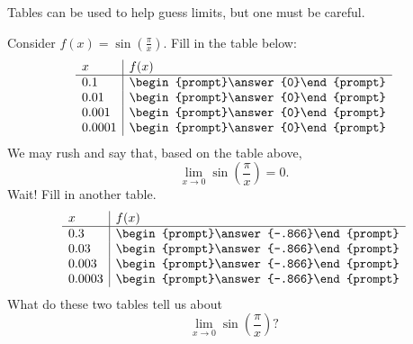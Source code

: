 \documentclass{ximera}
\begin{document}
Tables can be used to help guess limits, but one must be careful.

\begin{question}
  Consider $f(x) = \sin\left(\frac{\pi}{x}\right)$. Fill in the 
  table below:
   \[
  \begin{array}{l|l}
    x      & f(x)      \\ \hline
    0.1    & \begin{prompt}\answer{0}\end{prompt}\\
    0.01   & \begin{prompt}\answer{0}\end{prompt}\\
    0.001  & \begin{prompt}\answer{0}\end{prompt}\\
    0.0001 & \begin{prompt}\answer{0}\end{prompt} 
  \end{array}
    \]
  We may rush and say that, based on the table above,
   \[
  \lim_{x\to 0}\sin\left(\frac{\pi}{x}\right)=0.
  \]
Wait! Fill in another table.
  \[
  \begin{array}{l|l}
    x      & f(x)            \\ \hline
    0.3    &  \begin{prompt}\answer{-.866}\end{prompt} \\
    0.03   &  \begin{prompt}\answer{-.866}\end{prompt} \\
    0.003  &  \begin{prompt}\answer{-.866}\end{prompt} \\
    0.0003 &  \begin{prompt}\answer{-.866}\end{prompt}
  \end{array}
  \]
  What do these two tables tell us about
  \[
  \lim_{x\to 0}\sin\left(\frac{\pi}{x}\right)?
  \]
  \begin{multipleChoice}
  \end{multipleChoice}

\end{question}
\end{document}

